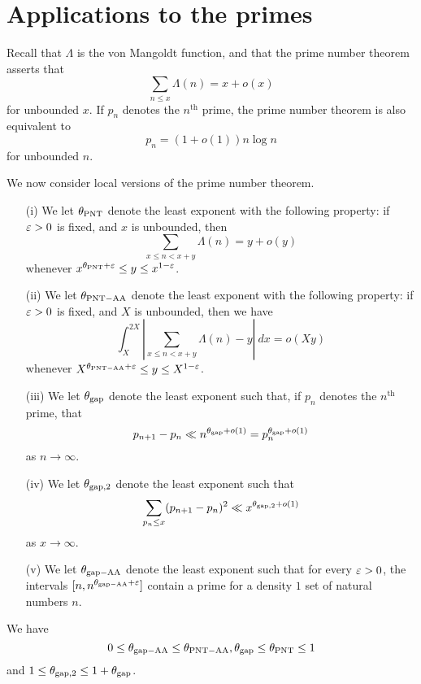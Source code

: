 \chapter{Applications to the primes}\label{primes-sec}

Recall that $\Lambda$ is the von Mangoldt function, and that the prime number theorem asserts that
$$ \sum_{n \leq x} \Lambda(n) = x + o(x)$$
for unbounded $x$.  If $p_n$ denotes the $n^{\mathrm{th}}$ prime, the prime number theorem is also equivalent to
$$ p_n = (1+o(1)) n \log n$$
for unbounded $n$.

We now consider local versions of the prime number theorem.

\begin{definition}\label{pnt-ap}
    \begin{itemize}
        \item[(i)] We let $\theta_{\mathrm{PNT}}$ denote the least exponent with the following property: if $\varepsilon > 0$ is fixed, and $x$ is unbounded, then
        $$ \sum_{x \leq n < x+y} \Lambda(n) = y + o(y)$$
        whenever $x^{\theta_{\mathrm{PNT}} + \varepsilon} \leq y \leq x^{1-\varepsilon}$.
        \item[(ii)] We let $\theta_{\mathrm{PNT-AA}}$ denote the least exponent with the following property: if $\varepsilon > 0$ is fixed, and $X$ is unbounded, then we have
        $$ \int_X^{2X} |\sum_{x \leq n < x+y} \Lambda(n)-y|\ dx = o(Xy)$$
        whenever $X^{\theta_{\mathrm{PNT-AA}} + \varepsilon} \leq y \leq X^{1-\varepsilon}$.
        \item[(iii)] We let $\theta_{\mathrm{gap}}$ denote the least exponent such that, if $p_n$ denotes the $n^{\mathrm{th}}$ prime, that
        $$ p_{n+1} - p_n \ll n^{\theta_{\mathrm{gap}}+o(1)} = p_n^{\theta_{\mathrm{gap}}+o(1)}$$
        as $n \to \infty$.
        \item[(iv)] We let $\theta_{\mathrm{gap},2}$ denote the least exponent such that
        $$ \sum_{p_n \leq x} (p_{n+1}-p_n)^2 \ll x^{\theta_{\mathrm{gap},2}+o(1)}$$
        as $x \to \infty$.
        \item[(v)] We let $\theta_{\mathrm{gap-AA}}$ denote the least exponent such that for every $\varepsilon>0$, the intervals $[n, n^{\theta_{\mathrm{gap-AA}}+\varepsilon}]$ contain a prime for a density $1$ set of natural numbers $n$.
    \end{itemize}
\end{definition}

\begin{lemma}\label{pnt-triv}
    We have
    $$ 0 \leq \theta_{\mathrm{gap-AA}} \leq \theta_{\mathrm{PNT-AA}}, \theta_{\mathrm{gap}} \leq \theta_{\mathrm{PNT}} \leq 1$$
    and $1 \leq \theta_{\mathrm{gap},2} \leq 1+\theta_{\mathrm{gap}}$.
\end{lemma}

